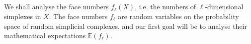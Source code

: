 \documentclass[11pt,twoside, reqno]{amsart}
\theoremstyle{plain}
\newtheorem{teo}[lema]{Theorem}
\theoremstyle{definition}
\newcommand{\N}{\mathbb{N}}
\newcommand{\E}{\mathbb{E}}
\newcommand{\tc}{{\sf{TC}}}
\begin{document}
\subsection{} We shall 
analyse the face numbers $f_\ell(X)$, i.e. the numbers of $\ell$-dimensional simplexes in $X$. The face numbers $f_\ell$ are random variables on the probability space of random simplicial complexes, and our first goal will be to analyse their mathematical expectations $\E(f_\ell)$.


%
%
%
%
%
\end{document}
